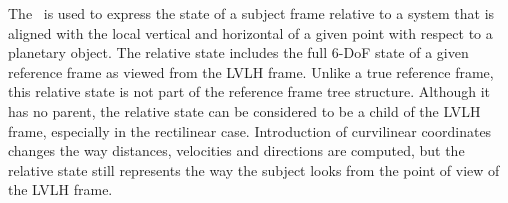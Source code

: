 %
%
% 
%


The \LRDSDesc\ is used to express the state of a subject frame
relative to a system that is aligned with the local vertical and horizontal
of a given point with respect to a planetary object. The relative state
includes the full 6-DoF state of a given reference frame as viewed from
the LVLH frame. Unlike a true reference frame, this relative state is not
part of the reference frame tree structure. Although it has no parent, the
relative state can be considered to be a child of the LVLH frame, especially
in the rectilinear case. Introduction of curvilinear coordinates changes the 
way distances, velocities and directions are computed, but the relative state
still represents the way the subject looks from the point of view of the
LVLH frame.


